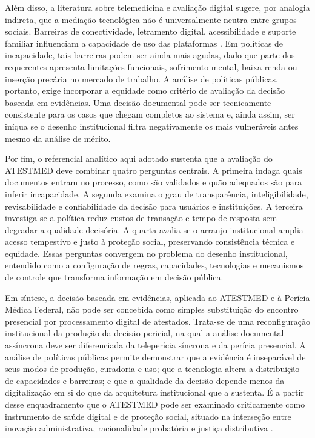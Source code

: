 \documentclass[12pt,a4paper]{article}
\begin{document}
Além disso, a literatura sobre telemedicina e avaliação digital sugere, por analogia indireta, que a mediação tecnológica não é universalmente neutra entre grupos sociais. Barreiras de conectividade, letramento digital, acessibilidade e suporte familiar influenciam a capacidade de uso das plataformas \parencite{ftouni2022challengesoftelemedicineduringthecovid19pandemica,albasheer2026telemedicineutilizationanddigitalinclusionamongpe}. Em políticas de incapacidade, tais barreiras podem ser ainda mais agudas, dado que parte dos requerentes apresenta limitações funcionais, sofrimento mental, baixa renda ou inserção precária no mercado de trabalho. A análise de políticas públicas, portanto, exige incorporar a equidade como critério de avaliação da decisão baseada em evidências. Uma decisão documental pode ser tecnicamente consistente para os casos que chegam completos ao sistema e, ainda assim, ser iníqua se o desenho institucional filtra negativamente os mais vulneráveis antes mesmo da análise de mérito.

Por fim, o referencial analítico aqui adotado sustenta que a avaliação do ATESTMED deve combinar quatro perguntas centrais. A primeira indaga quais documentos entram no processo, como são validados e quão adequados são para inferir incapacidade. A segunda examina o grau de transparência, inteligibilidade, revisabilidade e confiabilidade da decisão para usuários e instituições. A terceira investiga se a política reduz custos de transação e tempo de resposta sem degradar a qualidade decisória. A quarta avalia se o arranjo institucional amplia acesso tempestivo e justo à proteção social, preservando consistência técnica e equidade. Essas perguntas convergem no problema do desenho institucional, entendido como a configuração de regras, capacidades, tecnologias e mecanismos de controle que transforma informação em decisão pública.

Em síntese, a decisão baseada em evidências, aplicada ao ATESTMED e à Perícia Médica Federal, não pode ser concebida como simples substituição do encontro presencial por processamento digital de atestados. Trata-se de uma reconfiguração institucional da produção da decisão pericial, na qual a análise documental assíncrona deve ser diferenciada da teleperícia síncrona e da perícia presencial. A análise de políticas públicas permite demonstrar que a evidência é inseparável de seus modos de produção, curadoria e uso; que a tecnologia altera a distribuição de capacidades e barreiras; e que a qualidade da decisão depende menos da digitalização em si do que da arquitetura institucional que a sustenta. É a partir desse enquadramento que o ATESTMED pode ser examinado criticamente como instrumento de saúde digital e de proteção social, situado na interseção entre inovação administrativa, racionalidade probatória e justiça distributiva \parencite{soares20241031t0000000000asistematicadoatestmednaconcessa, gabbay2011niceguidanceonlongtermsicknessandincapacity, ftouni2022challengesoftelemedicineduringthecovid19pandemica, kelman2009performanceimprovementandperformancedysfunctionanemp}.
\end{document}
